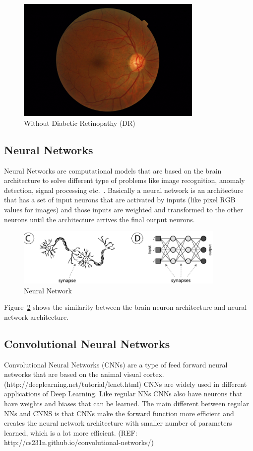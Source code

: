 \begin{figure}[t]
\centering
\includegraphics[width=0.8\textwidth]{Figures/NODR}
\caption{Without Diabetic Retinopathy (DR)}
\label{fignoDR}
\end{figure}

\subsection{Neural Networks}
Neural Networks are computational models that are based on the brain architecture to solve different type of problems like image recognition, anomaly detection, signal processing etc.\ \citep{shiffman2012nature}. Basically a neural network is an architecture that has a set of input neurons that are activated by inputs (like pixel RGB values for images) and those inputs are weighted and transformed to the other neurons until the architecture arrives the final output neurons. 

\begin{figure}[b]
\centering
\includegraphics[width=0.9\textwidth]{Figures/nn}
\caption{Neural Network}
\label{fignn}
\end{figure}

Figure~\ref{fignn} shows the similarity between the brain neuron architecture and neural network architecture. 

\subsection{Convolutional Neural Networks}
Convolutional Neural Networks (CNNs) are a type of feed forward neural networks that are based on the animal visual cortex. (http://deeplearning.net/tutorial/lenet.html) CNNs are widely used in different applications of Deep Learning. 
Like regular NNs CNNs also have neurons that have weights and biases that can be learned. The main different between regular NNs and CNNS is that CNNs make the forward function more efficient and creates the neural network architecture with smaller number of parameters learned, which is a lot more efficient. (REF: http://cs231n.github.io/convolutional-networks/) 

